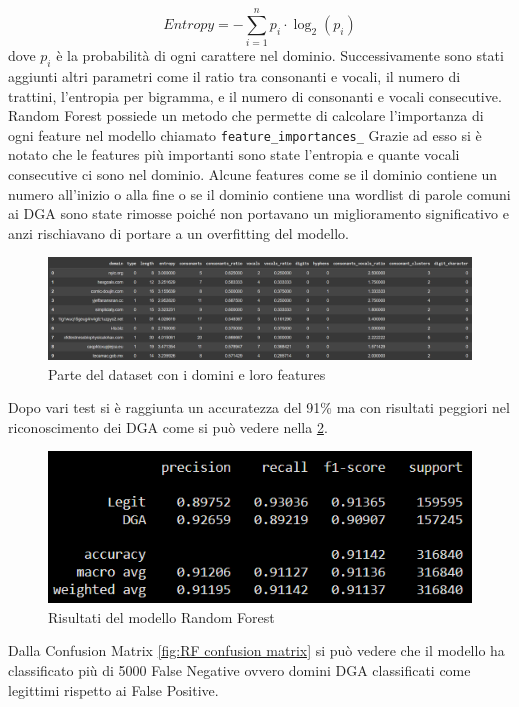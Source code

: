 \documentclass[12pt,a4paper,openright,twoside]{book}
\begin{document}
\begin{equation}
    Entropy = -\sum_{i=1}^{n} p_i \cdot \log_2(p_i)
\end{equation}
dove $p_i$ è la probabilità di ogni carattere nel dominio. \hfil \break
Successivamente sono stati aggiunti altri parametri come il ratio tra consonanti e vocali,
il numero di trattini, l'entropia per bigramma, e il numero di consonanti e vocali consecutive.
Random Forest possiede un metodo che permette di calcolare l'importanza di ogni feature nel modello
chiamato \texttt{feature\_importances\_}
Grazie ad esso si è notato che le features più importanti sono state
l'entropia e quante vocali consecutive ci sono nel dominio.
Alcune features come se il dominio contiene un numero all'inizio o alla fine
o se il dominio contiene una wordlist di parole comuni ai DGA sono state
rimosse poiché non portavano un miglioramento significativo e anzi 
rischiavano di portare a un overfitting del modello.
\begin{figure}[H]
    \centering
    \includegraphics[width=.8\linewidth]{figures/RF_feature.png}
    \caption{Parte del dataset con i domini e loro features}
    \label{fig:RF feature}
\end{figure}
\noindent Dopo vari test si è raggiunta un accuratezza del 91\% ma
con risultati peggiori nel riconoscimento dei DGA come si può vedere nella \cref{fig:RF results}.

\begin{figure}[H]
    \centering
    \includegraphics[width=.8\linewidth]{figures/RF_results.png}
    \caption{Risultati del modello Random Forest}
    \label{fig:RF results}
\end{figure}

\noindent Dalla Confusion Matrix \ref{fig:RF confusion matrix} si può vedere che il modello ha classificato
più di 5000 False Negative ovvero domini DGA classificati come legittimi rispetto ai False Positive.
\end{document}
